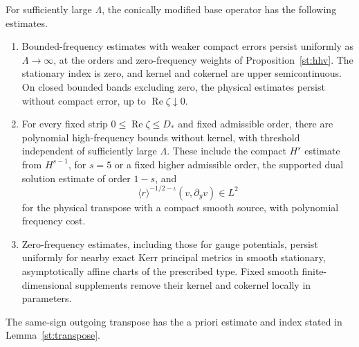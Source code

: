 \begin{proposition}\label{st:stationary-estimates}
For sufficiently large $\Lambda$, the conically modified base
operator has the following estimates.
\begin{enumerate}
\item Bounded-frequency estimates with weaker compact errors persist
uniformly as $\Lambda\to\infty$, at the orders and zero-frequency
weights of Proposition~\ref{st:hhv}.  The stationary index is zero,
and kernel and cokernel are upper semicontinuous.  On closed bounded
bands excluding zero, the physical estimates persist without compact
error, up to $\operatorname{Re}\zeta\downarrow0$.
\item For every fixed strip $0\leq\operatorname{Re}\zeta\leq D_*$
and fixed admissible order, there are polynomial high-frequency
bounds without kernel, with threshold independent of sufficiently
large $\Lambda$.  These include the compact $H^s$ estimate from
$H^{s-1}$, for $s=5$ or a fixed higher admissible order, the supported
dual solution estimate of order $1-s$, and
\[
 \langle r\rangle^{-1/2-\iota}(v,\partial_yv)\in L^2
\]
for the physical transpose with a compact smooth source, with
polynomial frequency cost.
\item Zero-frequency estimates, including those for gauge
potentials, persist uniformly for nearby exact Kerr principal
metrics in smooth stationary, asymptotically affine charts of
the prescribed type.  Fixed smooth finite-dimensional supplements
remove their kernel and cokernel locally in parameters.
\end{enumerate}
The same-sign outgoing transpose has the a priori estimate and
index stated in Lemma~\ref{st:transpose}.
\end{proposition}

